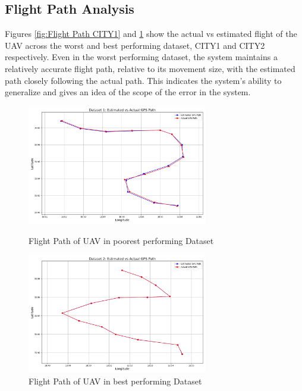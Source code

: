 \subsection{Flight Path Analysis}
Figures \ref{fig:Flight Path CITY1} and \ref{fig:Flight Path CITY2} show the actual vs estimated flight of the UAV across the worst and best performing dataset, CITY1 and CITY2 respectively. Even in the worst performing dataset, the system maintains a relatively accurate flight path, relative to its movement size, with the estimated path closely following the actual path. This indicates the system's ability to generalize and gives an idea of the scope of the error in the system.


    \begin{figure}[H]
        \centering
        \begin{minipage}{0.45\textwidth}
            \centering
            \includegraphics[width=0.7\textwidth]{./Chapter 5/GPSpaths/PathCity1.png}
            \caption{Flight Path of UAV in poorest performing Dataset}
            \label{fig:Flight Path CITY1}
        \end{minipage}\hfill
        \begin{minipage}{0.45\textwidth}
            \centering
            \includegraphics[width=0.7\textwidth]{./Chapter 5/GPSpaths/PathCity2.png}
            \caption{Flight Path of UAV in best performing Dataset}
            \label{fig:Flight Path CITY2}
        \end{minipage}
    \end{figure}


